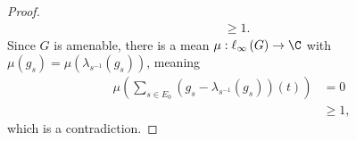 \documentclass[10pt]{mypackage}
\begin{document}
\begin{proof}
\begin{align*}
                                                                                                                               &\geq 1.
  \end{align*}
  Since $G$ is amenable, there is a  mean $\mu: \ell_{\infty}\left(G\right)\rightarrow \C$ with $\mu\left(g_s\right) = \mu\left(\lambda_{s^{-1}}\left(g_s\right)\right)$, meaning
  \begin{align*}
    \mu\left(\sum_{s\in E_0}\left(g_s - \lambda_{s^{-1}}\left(g_s\right)\right)\left(t\right)\right) &= 0\\
                                                                                                     &\geq 1,
  \end{align*}
  which is a contradiction.
\end{proof}
\end{document}
